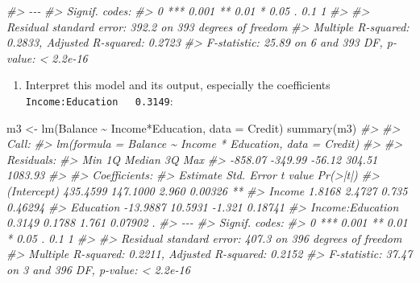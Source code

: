 \documentclass[
]{book}
\newenvironment{Shaded}{\begin{snugshade}}{\end{snugshade}}
\newcommand{\AttributeTok}[1]{\textcolor[rgb]{0.77,0.63,0.00}{#1}}
\newcommand{\CommentTok}[1]{\textcolor[rgb]{0.56,0.35,0.01}{\textit{#1}}}
\newcommand{\FunctionTok}[1]{\textcolor[rgb]{0.00,0.00,0.00}{#1}}
\newcommand{\NormalTok}[1]{#1}
\newcommand{\OtherTok}[1]{\textcolor[rgb]{0.56,0.35,0.01}{#1}}
\newcommand{\SpecialCharTok}[1]{\textcolor[rgb]{0.00,0.00,0.00}{#1}}
\providecommand{\tightlist}{%
  \setlength{\itemsep}{0pt}\setlength{\parskip}{0pt}}
\begin{document}
\begin{Shaded}
\begin{Highlighting}[]
\CommentTok{\#\textgreater{} {-}{-}{-}}
\CommentTok{\#\textgreater{} Signif. codes:  }
\CommentTok{\#\textgreater{} 0 \textquotesingle{}***\textquotesingle{} 0.001 \textquotesingle{}**\textquotesingle{} 0.01 \textquotesingle{}*\textquotesingle{} 0.05 \textquotesingle{}.\textquotesingle{} 0.1 \textquotesingle{} \textquotesingle{} 1}
\CommentTok{\#\textgreater{} }
\CommentTok{\#\textgreater{} Residual standard error: 392.2 on 393 degrees of freedom}
\CommentTok{\#\textgreater{} Multiple R{-}squared:  0.2833, Adjusted R{-}squared:  0.2723 }
\CommentTok{\#\textgreater{} F{-}statistic: 25.89 on 6 and 393 DF,  p{-}value: \textless{} 2.2e{-}16}
\end{Highlighting}
\end{Shaded}

\begin{enumerate}
\def\labelenumi{\arabic{enumi}.}
\setcounter{enumi}{5}
\tightlist
\item
  Interpret this model and its output, especially the coefficients \texttt{Income:Education\ \ \ 0.3149}:
\end{enumerate}

\begin{Shaded}
\begin{Highlighting}[]
\NormalTok{m3 }\OtherTok{\textless{}{-}} \FunctionTok{lm}\NormalTok{(Balance }\SpecialCharTok{\textasciitilde{}}\NormalTok{ Income}\SpecialCharTok{*}\NormalTok{Education, }\AttributeTok{data =}\NormalTok{ Credit)}
\FunctionTok{summary}\NormalTok{(m3)}
\CommentTok{\#\textgreater{} }
\CommentTok{\#\textgreater{} Call:}
\CommentTok{\#\textgreater{} lm(formula = Balance \textasciitilde{} Income * Education, data = Credit)}
\CommentTok{\#\textgreater{} }
\CommentTok{\#\textgreater{} Residuals:}
\CommentTok{\#\textgreater{}     Min      1Q  Median      3Q     Max }
\CommentTok{\#\textgreater{} {-}858.07 {-}349.99  {-}56.12  304.51 1083.93 }
\CommentTok{\#\textgreater{} }
\CommentTok{\#\textgreater{} Coefficients:}
\CommentTok{\#\textgreater{}                  Estimate Std. Error t value Pr(\textgreater{}|t|)   }
\CommentTok{\#\textgreater{} (Intercept)      435.4599   147.1000   2.960  0.00326 **}
\CommentTok{\#\textgreater{} Income             1.8168     2.4727   0.735  0.46294   }
\CommentTok{\#\textgreater{} Education        {-}13.9887    10.5931  {-}1.321  0.18741   }
\CommentTok{\#\textgreater{} Income:Education   0.3149     0.1788   1.761  0.07902 . }
\CommentTok{\#\textgreater{} {-}{-}{-}}
\CommentTok{\#\textgreater{} Signif. codes:  }
\CommentTok{\#\textgreater{} 0 \textquotesingle{}***\textquotesingle{} 0.001 \textquotesingle{}**\textquotesingle{} 0.01 \textquotesingle{}*\textquotesingle{} 0.05 \textquotesingle{}.\textquotesingle{} 0.1 \textquotesingle{} \textquotesingle{} 1}
\CommentTok{\#\textgreater{} }
\CommentTok{\#\textgreater{} Residual standard error: 407.3 on 396 degrees of freedom}
\CommentTok{\#\textgreater{} Multiple R{-}squared:  0.2211, Adjusted R{-}squared:  0.2152 }
\CommentTok{\#\textgreater{} F{-}statistic: 37.47 on 3 and 396 DF,  p{-}value: \textless{} 2.2e{-}16}
\end{Highlighting}
\end{Shaded}
\end{document}
